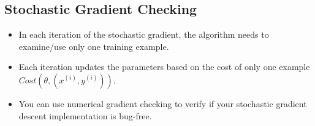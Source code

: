 \subsection*{Stochastic Gradient Checking}

\begin{itemize}
\item In each iteration of the stochastic gradient, the algorithm needs to examine/use only one training example.
\item Each iteration updates the parameters based on the cost of only one example $ Cost (\theta,(x^{(i)},y^{(i)}))$.
\item You can use numerical gradient checking to verify if your stochastic gradient descent implementation is bug-free.
\end{itemize}
